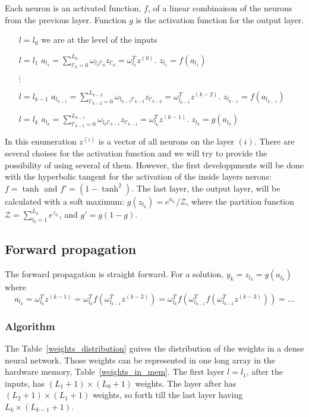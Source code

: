 \documentclass[final, paper=letter,5p,times,twocolumn]{elsarticle}
\begin{document}
Each neuron is an activated function, $f$, of a linear combinaison of the neurons from the previous layer. Function $g$ is the activation function for the output layer.

\begin{itemize}
    \item [$l = l_{0}$] we are at the level of the inputs
    \item [$l = l_{1}$] $a_{l_{1}} = \sum_{l'_{0} = 0}^{L_{0}} \omega_{l_{1}l'_{0}} z_{l'_{0}} = \omega_{l_{1}}^{T} z^{(0)}$. $z_{l_{1}} = f(a_{l_{1}})$
    \item [$\vdots$]
    \item [$l = l_{k-1}$] $a_{l_{k-1}} = \sum_{l'_{k-2} = 0}^{L_{k-2}} \omega_{l_{k-1}l'_{k-2}} z_{l'_{k-2}} = \omega_{l_{k-1}}^{T} z^{(k-2)}$. $z_{l_{k-1}} = f(a_{l_{k-1}})$
    \item [$l = l_{k}$] $a_{l_{k}} = \sum_{l'_{k-1} = 0}^{L_{k-1}} \omega_{l_{k}l'_{k-1}} z_{l'_{k-1}} = \omega_{l_{k}}^{T} z^{(k-1)}$. $z_{l_{k}} = g(a_{l_{k}})$
\end{itemize}

In this enumeration $z^{(i)}$ is a vector of all neurons on the layer $(i)$. There are several choises for the activation function and we will try to provide the possibility of using several of them. However, the first developpments will be done with the hyperbolic tangent for the activation of the inside layers nerons: $f = \tanh$ and $f' = (1 - \tanh^{2})$. The last layer, the output layer, will be calculated with a soft maximum: $g(z_{l_{k}}) = e^{a_{l_{k}}} / \mathcal{Z}$, where the partition function $\mathcal{Z} = \sum_{l_{k} = 1}^{L_{k}} e^{z_{l_{k}}}$, and $g' = g(1 - g)$.
  
\subsection{Forward propagation}

The forward propagation is straight forward. For a solution, $y_{k} = z_{l_{k}} = g(a_{l_{k}})$ where
$$
a_{l_{k}} = \omega_{l_{k}}^{T} z^{(k-1)} = \omega_{l_{k}}^{T} f(\omega_{l_{k-1}}^{T} z^{(k-2)}) = \omega_{l_{k}}^{T} f(\omega_{l_{k-1}}^{T} f(\omega_{l_{k-2}}^{T} z^{(k-3)})) = \dots
$$

\subsubsection{Algorithm}

The Table~\ref{weights_distribution} guives the distribution of the weights in a dense neural network. Those weights can be represented in one long array in the hardware memory, Table~\ref{weights_in_mem}. The first layer $l = l_{1}$, after the inputs, has $(L_{1}+1)\times(L_{0}+1)$ weights. The layer after has $(L_{2}+1)\times(L_{1}+1)$ weights, so forth till the last layer having $L_{k}\times(L_{k-1}+1)$.
\end{document}
